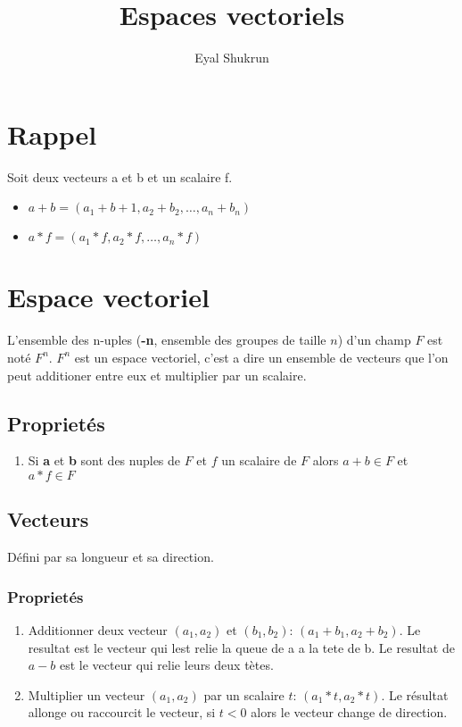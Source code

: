 \documentclass[12pt]{article}
\title{Espaces vectoriels}
\author{Eyal Shukrun}
\begin{document}
\maketitle

\section{Rappel}
Soit deux vecteurs a et b et un scalaire f.
  \begin{itemize}
    \item $a+b = (a_1+b+1, a_2+b_2, \ldots, a_n + b_n)$
    \item $a*f = (a_1*f, a_2*f, \ldots, a_n*f)$
  \end{itemize}  

\section{Espace vectoriel}
L'ensemble des n-uples (\textbf{-n}, ensemble des groupes de taille $n$) d'un champ $F$ est noté $F^n$. $F^n$ est un espace vectoriel, c'est a dire un ensemble de vecteurs que l'on peut additioner entre eux et multiplier par un scalaire.  
  
\subsection{Proprietés}
\begin{enumerate}
  \item Si \textbf{a} et \textbf{b} sont des nuples de $F$ et $f$ un scalaire de $F$ alors $a+b \in F$ et $a*f \in F$
\end{enumerate}
 
\subsection{Vecteurs}
Défini par sa longueur et sa direction. 

\subsubsection{Proprietés}
\begin{enumerate}
  \item Additionner deux vecteur $(a_1, a_2)$ et $(b_1, b_2)$: $(a_1+b_1, a_2+b_2)$. Le resultat est le vecteur qui lest relie la queue de a a la tete de b. Le resultat de $a-b$ est le vecteur qui relie leurs deux tètes. 
  \item Multiplier un vecteur $(a_1, a_2)$ par un scalaire $t$: $(a_1*t, a_2*t)$. Le résultat allonge ou raccourcit le vecteur, si $t < 0$ alors le vecteur change de direction.
\end{enumerate}
\end{document}

